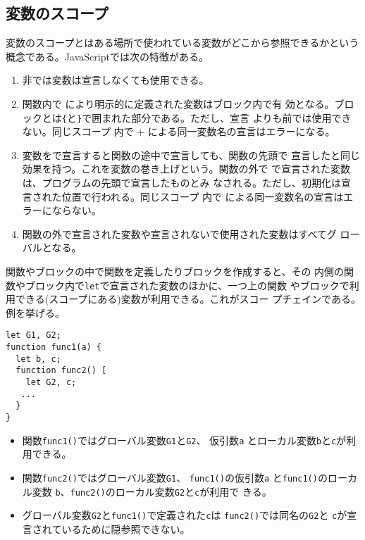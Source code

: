 \subsection{変数のスコープ}
変数のスコープとはある場所で使われている変数がどこから参照できるかという
概念である。JavaScriptでは次の特徴がある。
\begin{enumerate}
 \item 非\Strict では変数は宣言しなくても使用できる。\label{3-4NoDeclare}
 \item \label{3-4DeclareInFunc}
       関数内で  により明示的に定義された変数はブロック内で有
       効となる。ブロックとは\Verb+{+と\Verb+}+で囲まれた部分である。ただし、宣言
       よりも前では使用できない。同じスコープ
       内で + による同一変数名の宣言はエラーになる。
 \item 変数をで宣言すると関数の途中で宣言しても、関数の先頭で
       宣言したと同じ効果を持つ。これを変数の巻き上げという。関数の外で
        で宣言された変数は、プログラムの先頭で宣言したものとみ
       なされる。ただし、初期化は宣言された位置で行われる。同じスコープ
       内で  による同一変数名の宣言はエラーにならない。
 \item 関数の外で宣言された変数や宣言されないで使用された変数はすべてグ
       ローバルとなる。\label{3-4Declare2}
\end{enumerate}
関数やブロックの中で関数を定義したりブロックを作成すると、その
内側の関数やブロック内で\Verb+let+で宣言された変数のほかに、一つ上の関数
やブロックで利用できる(スコープにある)変数が利用できる。これがスコー
プチェインである。
例を挙げる。
\begin{Verbatim}
let G1, G2;
function func1(a) {
  let b, c;
  function func2() [
    let G2, c;
   ...
  }
}
\end{Verbatim}
\begin{itemize}
 \item 関数\Verb+func1()+ではグローバル変数\Verb+G1+と\Verb+G2+、
       仮引数\Verb+a+ とローカル変数\Verb+b+と\Verb+c+が利用できる。
 \item 関数\Verb+func2()+ではグローバル変数\Verb+G1+、
       \Verb+func1()+の仮引数\Verb+a+ と\Verb+func1()+のローカル変数
       \Verb+b+、\Verb+func2()+のローカル変数\Verb+G2+と\Verb+c+が利用で
       きる。
 \item グローバル変数\texttt{G2}と\Verb+func1()+で定義された\Verb+c+は
       \Verb+func2()+では同名の\texttt{G2}と
       \Verb+c+が宣言されているために隠参照できない。
\end{itemize}
